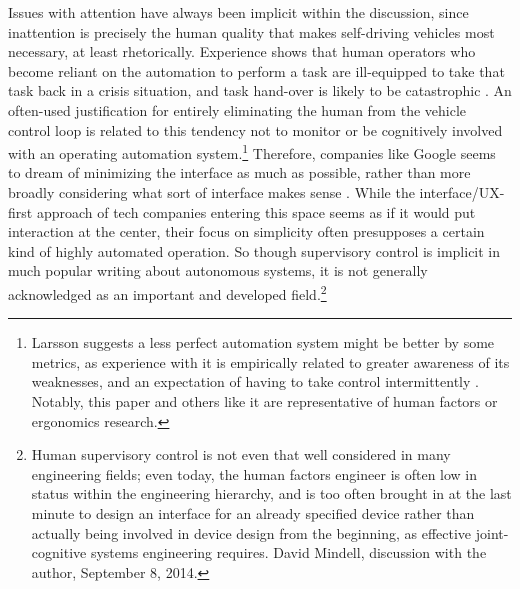 Issues with attention have always been implicit within the discussion,
since inattention is precisely the human quality that makes
self-driving vehicles most necessary, at least rhetorically. %
Experience shows that human operators who become reliant on the
automation to perform a task are ill-equipped to take that task back
in a crisis situation, and task hand-over is likely to be
catastrophic \cite{AF447} \cite{Chowpaper}. An often-used justification
for entirely eliminating the human from the vehicle control loop is
related to this tendency not to monitor or be cognitively involved
with an operating automation system.\footnote{Larsson suggests a less perfect
  automation system might be better 
  by some metrics, as experience with it is empirically related to
  greater awareness of its weaknesses, and an expectation of having to
take control intermittently \cite{larsson}. Notably, this paper and
others like it are representative of human factors or ergonomics
research.} Therefore, companies like Google seems to dream
of minimizing the interface as much as possible, rather than more
broadly considering what sort of interface makes sense \cite{markoffNext}.
While the interface/UX-first approach of tech companies entering this
space seems as if it
would put interaction at the center, their focus on simplicity often
presupposes a certain kind of highly automated operation.
So though supervisory control is
implicit in much popular writing about autonomous systems,
it is not generally acknowledged as an important and
developed field.\footnote{Human supervisory control is not even that well
considered in many engineering fields; even today, the human factors
engineer is often low in status within the engineering hierarchy, and
is too often brought in at the last minute to design an interface for
an already specified device rather than actually
being involved in 
device design from the beginning, as effective joint-cognitive systems
engineering
requires. David Mindell,
  discussion with the author, September 8, 2014.} %



